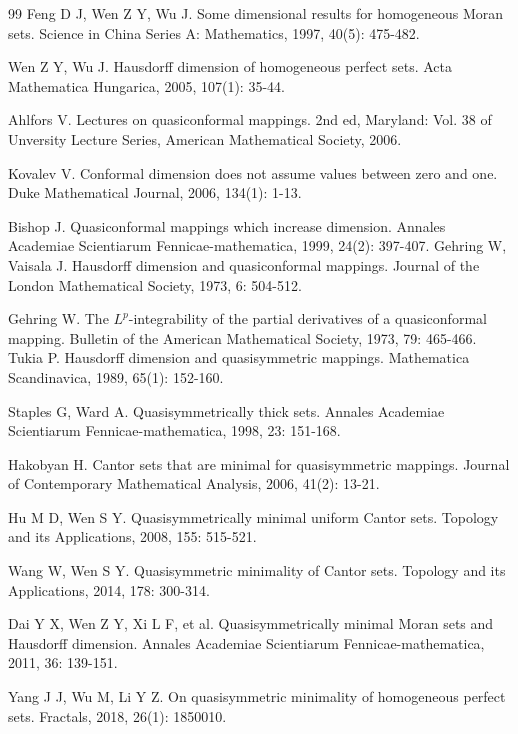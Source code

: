 \documentclass[reqno]{amsart}
\theoremstyle{plain}
\theoremstyle{definition}
\theoremstyle{remark}
\numberwithin{equation}{section} \DeclareMathOperator\intr{int}
\begin{document}
\bigskip
\begin{thebibliography}{99}
 Feng D J, Wen Z Y, Wu J. Some dimensional results for homogeneous Moran sets. Science in China Series A: Mathematics, 1997, 40(5): 475-482.

 Wen Z Y, Wu J. Hausdorff dimension of homogeneous perfect sets. Acta Mathematica Hungarica, 2005, 107(1): 35-44.

 Ahlfors V. \newblock Lectures on quasiconformal mappings. 2nd ed, Maryland: Vol. 38 of Unversity Lecture Series, American Mathematical Society, 2006.



 Kovalev V. Conformal dimension does not assume values between zero and one. Duke Mathematical Journal, 2006, 134(1): 1-13.

 Bishop J. Quasiconformal mappings which increase dimension. Annales Academiae Scientiarum Fennicae-mathematica, 1999, 24(2): 397-407.
 Gehring W, Vaisala J. \newblock Hausdorff dimension and quasiconformal mappings. Journal of the London Mathematical Society, 1973, 6: 504-512.

 Gehring  W. \newblock The $L^p$-integrability of the partial derivatives of a quasiconformal mapping. Bulletin of the American Mathematical Society, 1973, 79: 465-466.
 Tukia P. \newblock Hausdorff dimension and quasisymmetric mappings. Mathematica Scandinavica, 1989, 65(1): 152-160.

 Staples G, Ward A. \newblock Quasisymmetrically thick sets. Annales Academiae Scientiarum Fennicae-mathematica, 1998, 23: 151-168.

 Hakobyan H. \newblock Cantor sets that are minimal for quasisymmetric mappings. Journal of Contemporary Mathematical Analysis, 2006, 41(2): 13-21.

 Hu M D, Wen S Y. \newblock Quasisymmetrically minimal uniform Cantor sets. Topology and its Applications, 2008, 155: 515-521.

 Wang W, Wen S Y. \newblock Quasisymmetric minimality of Cantor sets. Topology and its Applications, 2014, 178: 300-314.

 Dai Y X, Wen Z Y, Xi L F, et al. \newblock Quasisymmetrically minimal Moran sets and Hausdorff dimension. Annales Academiae Scientiarum Fennicae-mathematica, 2011, 36: 139-151.

 Yang J J, Wu M, Li Y Z. \newblock On quasisymmetric minimality of homogeneous perfect sets. Fractals, 2018, 26(1): 1850010.


\end{thebibliography}
\end{document}
